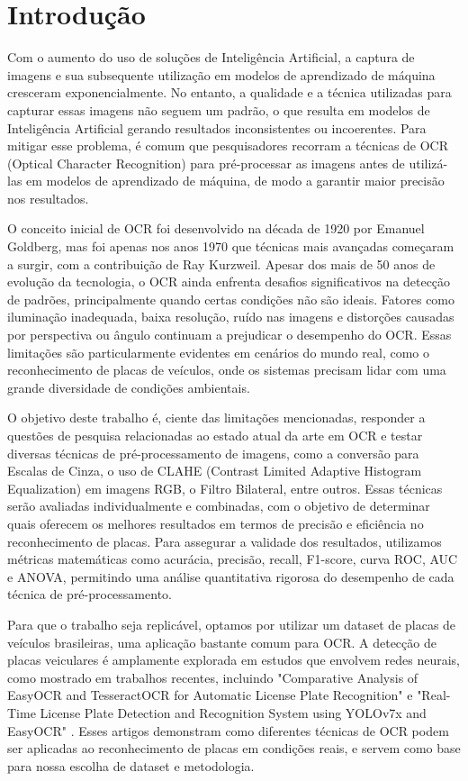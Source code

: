 \documentclass[conference]{IEEEtran}
\begin{document}
\section{Introdução}
Com o aumento do uso de soluções de Inteligência Artificial, a captura de imagens e sua subsequente utilização em modelos de aprendizado de máquina cresceram exponencialmente. No entanto, a qualidade e a técnica utilizadas para capturar essas imagens não seguem um padrão, o que resulta em modelos de Inteligência Artificial gerando resultados inconsistentes ou incoerentes. Para mitigar esse problema, é comum que pesquisadores recorram a técnicas de OCR (Optical Character Recognition) para pré-processar as imagens antes de utilizá-las em modelos de aprendizado de máquina, de modo a garantir maior precisão nos resultados.

O conceito inicial de OCR foi desenvolvido na década de 1920 por Emanuel Goldberg, mas foi apenas nos anos 1970 que técnicas mais avançadas começaram a surgir, com a contribuição de Ray Kurzweil. Apesar dos mais de 50 anos de evolução da tecnologia, o OCR ainda enfrenta desafios significativos na detecção de padrões, principalmente quando certas condições não são ideais. Fatores como iluminação inadequada, baixa resolução, ruído nas imagens e distorções causadas por perspectiva ou ângulo continuam a prejudicar o desempenho do OCR. Essas limitações são particularmente evidentes em cenários do mundo real, como o reconhecimento de placas de veículos, onde os sistemas precisam lidar com uma grande diversidade de condições ambientais.

O objetivo deste trabalho é, ciente das limitações mencionadas, responder a questões de pesquisa relacionadas ao estado atual da arte em OCR e testar diversas técnicas de pré-processamento de imagens, como a conversão para Escalas de Cinza, o uso de CLAHE (Contrast Limited Adaptive Histogram Equalization) em imagens RGB, o Filtro Bilateral, entre outros. Essas técnicas serão avaliadas individualmente e combinadas, com o objetivo de determinar quais oferecem os melhores resultados em termos de precisão e eficiência no reconhecimento de placas. Para assegurar a validade dos resultados, utilizamos métricas matemáticas como acurácia, precisão, recall, F1-score, curva ROC, AUC e ANOVA, permitindo uma análise quantitativa rigorosa do desempenho de cada técnica de pré-processamento.

Para que o trabalho seja replicável, optamos por utilizar um dataset de placas de veículos brasileiras, uma aplicação bastante comum para OCR. A detecção de placas veiculares é amplamente explorada em estudos que envolvem redes neurais, como mostrado em trabalhos recentes, incluindo "Comparative Analysis of EasyOCR and TesseractOCR for Automatic License Plate Recognition" \cite{b1} e "Real-Time License Plate Detection and Recognition System using YOLOv7x and EasyOCR" \cite{b2}. Esses artigos demonstram como diferentes técnicas de OCR podem ser aplicadas ao reconhecimento de placas em condições reais, e servem como base para nossa escolha de dataset e metodologia.
\end{document}
